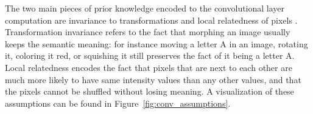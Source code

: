 \documentclass{article}
\begin{document}
The two main pieces of prior knowledge encoded to the convolutional layer computation
 are invariance to transformations and local relatedness of pixels \cite{princebook}.
Transformation invariance refers to the fact that morphing an image usually keeps the semantic meaning: for instance
 moving a letter A in an image, 
rotating it, coloring it red, or squishing it still preserves the fact of it being a letter A. Local relatedness 
encodes the fact that pixels that are next to each other are much more likely to have same intensity values than any other 
values, and that the pixels cannot be shuffled without losing meaning. A visualization of these assumptions can be found in 
Figure~\ref{fig:conv_assumptions}.

\begin{figure}[h]
    \centering
\end{figure}
\end{document}
